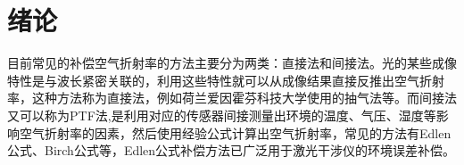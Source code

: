 \chapter{绪论}



目前常见的补偿空气折射率的方法主要分为两类：直接法和间接法。光的某些成像特性是与波长紧密关联的，利用这些特性就可以从成像结果直接反推出空气折射率，这种方法称为直接法，例如荷兰爱因霍芬科技大学使用的抽气法等。而间接法又可以称为PTF法\cite{高精度空气折射率测量系统设计与实现},是利用对应的传感器间接测量出环境的温度、气压、湿度等影响空气折射率的因素，然后使用经验公式计算出空气折射率，常见的方法有Edlen公式、Birch公式等，Edlen公式补偿方法已广泛用于激光干涉仪的环境误差补偿。
